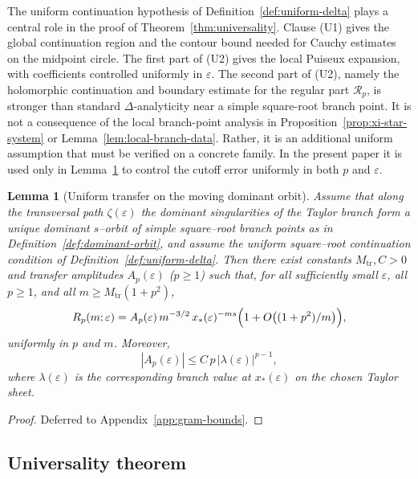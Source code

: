 \documentclass[11pt]{amsart}
\numberwithin{equation}{section}
\theoremstyle{plain}
\newtheorem{lemma}[theorem]{Lemma}
\theoremstyle{definition}
\theoremstyle{remark}
\begin{document}
The uniform continuation hypothesis of Definition~\ref{def:uniform-delta} plays
a central role in the proof of Theorem~\ref{thm:universality}.
Clause \textup{(U1)} gives the global continuation region and the contour bound needed for
Cauchy estimates on the midpoint circle. The first part of \textup{(U2)} gives the local
Puiseux expansion, with coefficients controlled uniformly in \(\varepsilon\). The second part of
\textup{(U2)}, namely the holomorphic continuation and boundary estimate for the regular part
\(\mathcal R_p\), is stronger than standard \(\Delta\)-analyticity near a simple square-root
branch point. It is not a consequence of the local branch-point analysis in
Proposition~\ref{prop:xi-star-system} or Lemma~\ref{lem:local-branch-data}. Rather, it is an
additional uniform assumption that must be verified on a concrete family. In the present paper it is
used only in Lemma~\ref{lem:uniform-transfer} to control the cutoff error uniformly in both \(p\) and
\(\varepsilon\).

\begin{lemma}[Uniform transfer on the moving dominant orbit]
	\label{lem:uniform-transfer}
	Assume that along the transversal path $\zeta(\varepsilon)$ the dominant singularities of the Taylor branch
	form a unique dominant $s$--orbit of simple square--root branch points as in Definition~\ref{def:dominant-orbit},
	and assume the uniform square--root continuation condition of Definition~\ref{def:uniform-delta}.
	Then there exist constants $M_{\mathrm{tr}},C>0$ and transfer amplitudes $A_p(\varepsilon)$ ($p\ge1$) such that,
	for all sufficiently small $\varepsilon$, all $p\ge1$, and all $m\ge M_{\mathrm{tr}}(1+p^2)$,
	\begin{equation}
		\label{eq:uniform-transfer}
		R_p(m;\varepsilon)
		=
		A_p(\varepsilon)\, m^{-3/2}\,x_*(\varepsilon)^{-ms}
		\Bigl(1+O\bigl((1+p^2)/m\bigr)\Bigr),
	\end{equation}
	uniformly in $p$ and $m$.
	Moreover,
	\begin{equation}
		\label{eq:Ap-growth}
		|A_p(\varepsilon)|\le C\,p\,|\lambda(\varepsilon)|^{p-1},
	\end{equation}
	where $\lambda(\varepsilon)$ is the corresponding branch value at
$x_*(\varepsilon)$ on the chosen Taylor sheet.
\end{lemma}

\begin{proof}
	Deferred to Appendix~\ref{app:gram-bounds}.
\end{proof}

\subsection{Universality theorem}\label{subsec:universality-thm}
\end{document}
